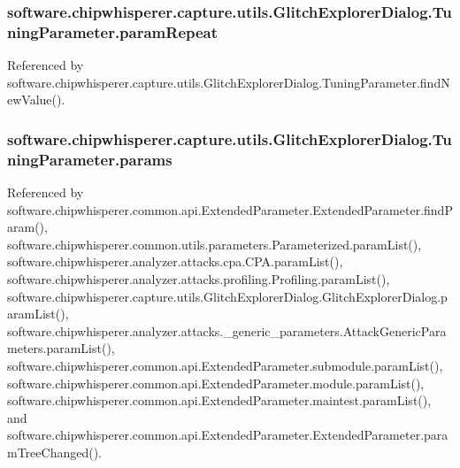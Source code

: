 \subsubsection[{param\+Repeat}]{\setlength{\rightskip}{0pt plus 5cm}software.\+chipwhisperer.\+capture.\+utils.\+Glitch\+Explorer\+Dialog.\+Tuning\+Parameter.\+param\+Repeat}\label{classsoftware_1_1chipwhisperer_1_1capture_1_1utils_1_1GlitchExplorerDialog_1_1TuningParameter_a2cda1f9774aa60e6f9a821c4399775ff}


Referenced by software.\+chipwhisperer.\+capture.\+utils.\+Glitch\+Explorer\+Dialog.\+Tuning\+Parameter.\+find\+New\+Value().

\hypertarget{classsoftware_1_1chipwhisperer_1_1capture_1_1utils_1_1GlitchExplorerDialog_1_1TuningParameter_a800831467defec0d17289f909d6d69f8}{}
\subsubsection[{params}]{\setlength{\rightskip}{0pt plus 5cm}software.\+chipwhisperer.\+capture.\+utils.\+Glitch\+Explorer\+Dialog.\+Tuning\+Parameter.\+params}\label{classsoftware_1_1chipwhisperer_1_1capture_1_1utils_1_1GlitchExplorerDialog_1_1TuningParameter_a800831467defec0d17289f909d6d69f8}


Referenced by software.\+chipwhisperer.\+common.\+api.\+Extended\+Parameter.\+Extended\+Parameter.\+find\+Param(), software.\+chipwhisperer.\+common.\+utils.\+parameters.\+Parameterized.\+param\+List(), software.\+chipwhisperer.\+analyzer.\+attacks.\+cpa.\+C\+P\+A.\+param\+List(), software.\+chipwhisperer.\+analyzer.\+attacks.\+profiling.\+Profiling.\+param\+List(), software.\+chipwhisperer.\+capture.\+utils.\+Glitch\+Explorer\+Dialog.\+Glitch\+Explorer\+Dialog.\+param\+List(), software.\+chipwhisperer.\+analyzer.\+attacks.\+\_\+generic\+\_\+parameters.\+Attack\+Generic\+Parameters.\+param\+List(), software.\+chipwhisperer.\+common.\+api.\+Extended\+Parameter.\+submodule.\+param\+List(), software.\+chipwhisperer.\+common.\+api.\+Extended\+Parameter.\+module.\+param\+List(), software.\+chipwhisperer.\+common.\+api.\+Extended\+Parameter.\+maintest.\+param\+List(), and software.\+chipwhisperer.\+common.\+api.\+Extended\+Parameter.\+Extended\+Parameter.\+param\+Tree\+Changed().

